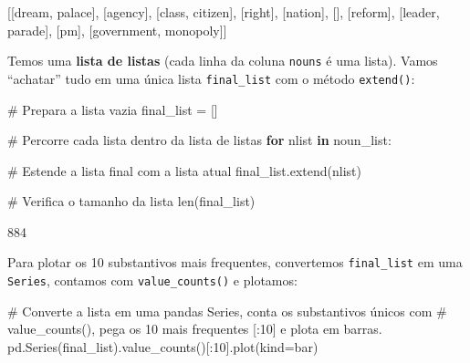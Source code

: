 \documentclass[
  brazilian,
  11pt,
]{article}
\newenvironment{Shaded}{\begin{snugshade}}{\end{snugshade}}
\newcommand{\BuiltInTok}[1]{\textcolor[rgb]{0.50,0.55,0.55}{#1}}
\newcommand{\CommentTok}[1]{\textcolor[rgb]{0.48,0.49,0.49}{#1}}
\newcommand{\ControlFlowTok}[1]{\textcolor[rgb]{0.99,0.74,0.29}{\textbf{#1}}}
\newcommand{\DecValTok}[1]{\textcolor[rgb]{0.96,0.45,0.00}{#1}}
\newcommand{\KeywordTok}[1]{\textcolor[rgb]{0.81,0.81,0.76}{\textbf{#1}}}
\newcommand{\NormalTok}[1]{\textcolor[rgb]{0.81,0.81,0.76}{#1}}
\newcommand{\OperatorTok}[1]{\textcolor[rgb]{0.81,0.81,0.76}{#1}}
\newcommand{\StringTok}[1]{\textcolor[rgb]{0.96,0.31,0.31}{#1}}
\let\oldtexttt\texttt
\renewcommand{\texttt}[1]{{\color{inlink}\oldtexttt{#1}}}
\begin{document}
\begin{Shaded}
\begin{Highlighting}[]
\NormalTok{[[\textquotesingle{}dream\textquotesingle{}, \textquotesingle{}palace\textquotesingle{}], [\textquotesingle{}agency\textquotesingle{}], [\textquotesingle{}class\textquotesingle{}, \textquotesingle{}citizen\textquotesingle{}], [\textquotesingle{}right\textquotesingle{}],}
\NormalTok{ [\textquotesingle{}nation\textquotesingle{}], [], [\textquotesingle{}reform\textquotesingle{}], [\textquotesingle{}leader\textquotesingle{}, \textquotesingle{}parade\textquotesingle{}], [\textquotesingle{}pm\textquotesingle{}],}
\NormalTok{ [\textquotesingle{}government\textquotesingle{}, \textquotesingle{}monopoly\textquotesingle{}]]}
\end{Highlighting}
\end{Shaded}

Temos uma \textbf{lista de listas} (cada linha da coluna \texttt{nouns}
é uma lista). Vamos ``achatar'' tudo em uma única lista
\texttt{final\_list} com o método \texttt{extend()}:

\begin{Shaded}
\begin{Highlighting}[]
\CommentTok{\# Prepara a lista vazia}
\NormalTok{final\_list }\OperatorTok{=}\NormalTok{ []}

\CommentTok{\# Percorre cada lista dentro da lista de listas}
\ControlFlowTok{for}\NormalTok{ nlist }\KeywordTok{in}\NormalTok{ noun\_list:}

    \CommentTok{\# Estende a lista final com a lista atual}
\NormalTok{    final\_list.extend(nlist)}

\CommentTok{\# Verifica o tamanho da lista}
\BuiltInTok{len}\NormalTok{(final\_list)}
\end{Highlighting}
\end{Shaded}

\begin{Shaded}
\begin{Highlighting}[]
\NormalTok{884}
\end{Highlighting}
\end{Shaded}

Para plotar os 10 substantivos mais frequentes, convertemos
\texttt{final\_list} em uma \texttt{Series}, contamos com
\texttt{value\_counts()} e plotamos:

\begin{Shaded}
\begin{Highlighting}[]
\CommentTok{\# Converte a lista em uma pandas Series, conta os substantivos únicos com}
\CommentTok{\# value\_counts(), pega os 10 mais frequentes [:10] e plota em barras.}
\NormalTok{pd.Series(final\_list).value\_counts()[:}\DecValTok{10}\NormalTok{].plot(kind}\OperatorTok{=}\StringTok{\textquotesingle{}bar\textquotesingle{}}\NormalTok{)}
\end{Highlighting}
\end{Shaded}
\end{document}
